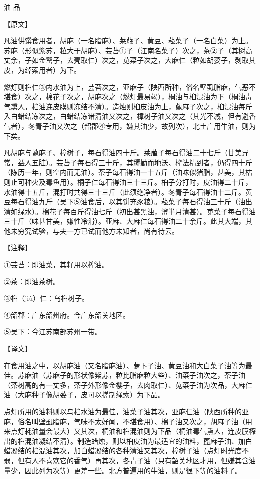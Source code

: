 \documentclass[12pt,UTF8]{ctexbook}
\begin{document}
油 品

【原文】

凡油供馔食用者，胡麻（一名脂麻）、莱菔子、黄豆、菘菜子（一名白菜）为上。苏麻（形似紫苏，粒大于胡麻）、芸苔①子（江南名菜子）次之，茶②子（其树高丈余，子如金罂子，去壳取仁）次之，苋菜子次之，大麻仁（粒如胡荽子，剥取其皮，为绰索用者）为下。

燃灯则桕仁③内水油为上，芸苔次之，亚麻子（陕西所种，俗名壁虱脂麻，气恶不堪食）次之，棉花子次之，胡麻次之（燃灯最易竭），桐油与桕混油为下（桐油毒气熏人，桕油连皮膜则冻结不清）。造烛则桕皮油为上，蓖麻子次之，桕混油每斤入白蜡结冻次之，白蜡结冻诸清油又次之，樟树子油又次之（其光不减，但有避香气者），冬青子油又次之（韶郡④专用，嫌其油少，故列次），北土广用牛油，则为下矣。

凡胡麻与蓖麻子、樟树子，每石得油四十斤。莱菔子每石得油二十七斤（甘美异常，益人五脏）。芸苔子每石得三十斤，其耨勤而地沃、榨法精到者，仍得四十斤（陈历一年，则空内而无油）。茶子每石得油一十五斤（油味似猪脂，甚美，其枯则止可种火及毒鱼用）。桐子仁每石得油三十三斤。桕子分打时，皮油得二十斤，水油得十五斤，混打时共得三十三斤（此须绝净者）。冬青子每石得油十二斤。黄豆每石得油九斤（吴下⑤油食后，以其饼充豕粮）。菘菜子每石得油三十斤（油出清如绿水）。棉花子每百斤得油七斤（初出甚黑浊，澄半月清甚）。苋菜子每石得油三十斤（味甚甘美，嫌性冷滑）。亚麻、大麻仁每石得油二十余斤。此其大端，其他未穷究试验，与夫一方已试而他方未知者，尚有待云。

【注释】

①芸苔：即油菜，其籽用以榨油。

②茶：即油茶树。

③桕（jiù）仁：乌桕树子。

④韶郡：广东韶州府。今广东韶关地区。

⑤吴下：今江苏南部苏州一带。

【译文】

在食用油之中，以胡麻油（又名脂麻油）、萝卜子油、黄豆油和大白菜子油等为最佳。苏麻油（苏麻子的形状像紫苏，粒比脂麻粒大些）、油菜子油次之，茶子油（茶树高的有一丈多，茶子外形像金樱子，去肉取仁）、苋菜子油为次品，大麻仁油（大麻种子像胡荽子，皮可以搓制绳索）为下品。

点灯所用的油料则以乌桕水油为最佳，油菜子油其次，亚麻仁油（陕西所种的亚麻，俗名叫壁虱脂麻，气味不太好闻，不堪食用）、棉子油又次之，胡麻子油（用来点灯耗油量会最大）又其次，桐油和桕混油则为下品（桐油毒气熏人，连皮膜榨出的桕混油凝结不清）。制造蜡烛，则以桕皮油为最适宜的油料，蓖麻子油、加白蜡凝结的桕混油其次，加白蜡凝结的各种清油又其次，樟树子油（点灯时光度不弱，但有人不喜欢它的香气）再其次，冬青子油（只有韶关地区才用，但嫌其含油量少，因此列为次等）更差一些。北方普遍用的牛油，则是很下等的油料了。
\end{document}
